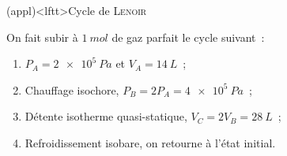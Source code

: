 \documentclass[../../main/main.tex]{subfiles}
\begin{document}
\begin{tcb*}[breakable](appl)<lftt>{Cycle de \textsc{Lenoir}}
	\begin{isd}[righthand ratio=.40]
		On fait subir à $\SI{1}{mol}$ de gaz parfait le cycle suivant~:
		\begin{enumerate}[label=\clalphi]
			\item $P_A = \SI{2e5}{Pa}$ et $V_A = \SI{14}{L}$~;
			\item Chauffage isochore, $P_B = 2P_A = \SI{4e5}{Pa}$~;
			\item Détente isotherme quasi-statique, $V_C = 2V_B = \SI{28}{L}$~;
			\item Refroidissement isobare, on retourne à l'état initial.
		\end{enumerate}
		\tcblower
		\begin{center}

\end{center}
\end{isd}
\end{tcb*}
\end{document}
